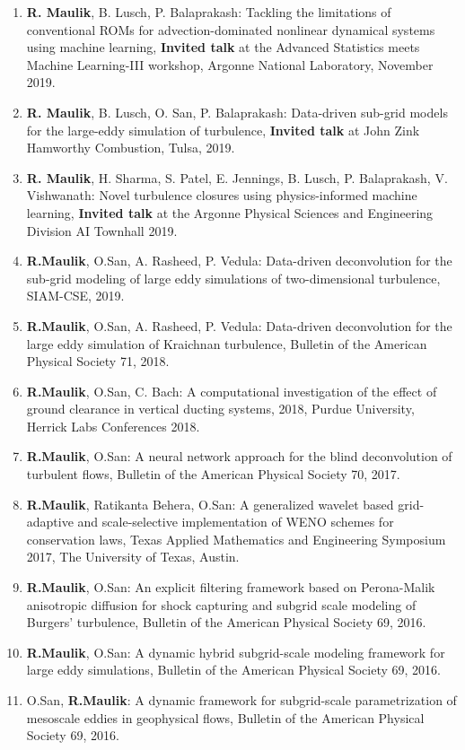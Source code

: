 \documentclass[letterpaper]{article}
\begin{document}
\begin{enumerate}
\item \textbf{R. Maulik}, B. Lusch, P. Balaprakash: Tackling the limitations of conventional ROMs for advection-dominated nonlinear dynamical systems using machine learning, \textbf{Invited talk} at the Advanced Statistics meets Machine Learning-III workshop, Argonne National Laboratory, November 2019.

\item \textbf{R. Maulik}, B. Lusch, O. San, P. Balaprakash: Data-driven sub-grid models for the large-eddy simulation of turbulence, \textbf{Invited talk} at John Zink Hamworthy Combustion, Tulsa, 2019.

\item \textbf{R. Maulik}, H. Sharma, S. Patel, E. Jennings, B. Lusch, P. Balaprakash, V. Vishwanath: Novel turbulence closures using physics-informed machine learning, \textbf{Invited talk} at the Argonne Physical Sciences and Engineering Division AI Townhall 2019. 

\item \textbf{R.Maulik}, O.San, A. Rasheed, P. Vedula: Data-driven deconvolution for the sub-grid modeling of large eddy simulations of two-dimensional turbulence, SIAM-CSE, 2019.

\item \textbf{R.Maulik}, O.San, A. Rasheed, P. Vedula: Data-driven deconvolution for the large eddy simulation of Kraichnan turbulence, Bulletin of the American Physical Society 71, 2018.

\item \textbf{R.Maulik}, O.San, C. Bach: A computational investigation of the effect of ground clearance in vertical ducting systems, 2018, Purdue University, Herrick Labs Conferences 2018. 

\item \textbf{R.Maulik}, O.San: A neural network approach for the blind deconvolution of turbulent flows, Bulletin of the American Physical Society 70, 2017.

\item \textbf{R.Maulik}, Ratikanta Behera, O.San: A generalized wavelet based grid-adaptive and scale-selective
implementation of WENO schemes for conservation laws, Texas Applied Mathematics and Engineering Symposium 2017, The University of Texas, Austin.

\item \textbf{R.Maulik}, O.San: An explicit filtering framework based on Perona-Malik anisotropic diffusion for shock capturing and subgrid scale modeling of Burgers' turbulence,  Bulletin of the American Physical Society 69, 2016.

\item \textbf{R.Maulik}, O.San:  A dynamic hybrid subgrid-scale modeling framework for large eddy simulations,  Bulletin of the American Physical Society 69, 2016.

\item O.San, \textbf{R.Maulik}: A dynamic framework for subgrid-scale parametrization of mesoscale eddies in geophysical flows, Bulletin of the American Physical Society 69, 2016.

\end{enumerate}
\end{document}
